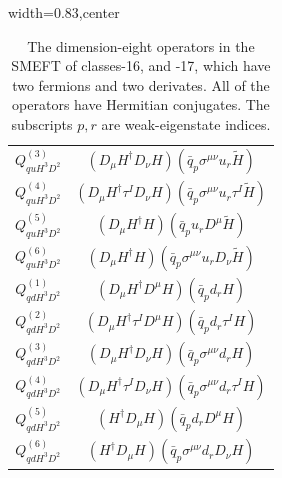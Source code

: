 \begin{table}[H]
\begin{center}
\begin{adjustbox}{width=0.83\textwidth,center}
\begin{minipage}[t]{5.7cm}
\begin{tabular}[t]{c|c}
%
$Q_{quH^3D^2}^{(3)}$  & $(D_\mu H^\dag D_\nu H) (\bar q_p \sigma^{\mu\nu} u_r \widetilde H)$ \\
%
$Q_{quH^3D^2}^{(4)}$  & $(D_\mu H^\dag \tau^I D_\nu H) (\bar q_p \sigma^{\mu\nu} u_r \tau^I \widetilde H)$ \\
%
$Q_{quH^3D^2}^{(5)}$  & $(D_\mu H^\dag H) (\bar q_p u_r D^\mu \widetilde H)$ \\
%
$Q_{quH^3D^2}^{(6)}$  & $(D_\mu H^\dag H) (\bar q_p \sigma^{\mu\nu} u_r D_\nu \widetilde H)$ \\
%
$Q_{qdH^3D^2}^{(1)}$  & $(D_\mu H^\dag D^\mu H) (\bar q_p d_r H)$ \\
%
$Q_{qdH^3D^2}^{(2)}$  & $(D_\mu H^\dag \tau^I D^\mu H) (\bar q_p d_r \tau^I H)$ \\
%
$Q_{qdH^3D^2}^{(3)}$  & $(D_\mu H^\dag D_\nu H) (\bar q_p \sigma^{\mu\nu} d_r H)$ \\
%
$Q_{qdH^3D^2}^{(4)}$  & $(D_\mu H^\dag \tau^I D_\nu H) (\bar q_p \sigma^{\mu\nu} d_r \tau^I H)$ \\
%
$Q_{qdH^3D^2}^{(5)}$  & $(H^\dag D_\mu H) (\bar q_p d_r D^\mu H)$ \\
%
$Q_{qdH^3D^2}^{(6)}$  & $(H^\dag D_\mu H) (\bar q_p \sigma^{\mu\nu} d_r D_\nu H)$ 
\end{tabular}
\end{minipage}
\end{adjustbox}
\end{center}
\caption{The dimension-eight operators in the SMEFT of classes-16, and -17, which have two fermions and two derivates. All of the operators have Hermitian conjugates. The subscripts $p, r$ are weak-eigenstate indices.}
\label{tab:smeft8class_16_17}
\end{table}